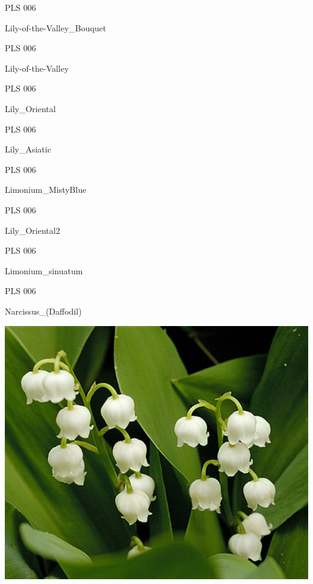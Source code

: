 \documentclass{article}
\begin{document}
\noindent  PLS 006
\vfill
\centerline{{\huge Lily-of-the-Valley\_Bouquet }}
\vfill
\newpage

\noindent  PLS 006
\vfill
\centerline{{\huge Lily-of-the-Valley }}
\vfill
\newpage

\noindent  PLS 006
\vfill
\centerline{{\huge Lily\_Oriental }}
\vfill
\newpage

\noindent  PLS 006
\vfill
\centerline{{\huge Lily\_Asiatic }}
\vfill
\newpage

\noindent  PLS 006
\vfill
\centerline{{\huge Limonium\_MistyBlue }}
\vfill
\newpage

\noindent  PLS 006
\vfill
\centerline{{\huge Lily\_Oriental2 }}
\vfill
\newpage

\noindent  PLS 006
\vfill
\centerline{{\huge Limonium\_sinuatum }}
\vfill
\newpage

\noindent  PLS 006
\vfill
\centerline{{\huge Narcissus\_(Daffodil) }}
\vfill
\newpage

\begin{center}
\includegraphics[height=0.925\paperheight]{../Lily-of-the-Valley.jpg}
\end{center}
\newpage
\end{document}
